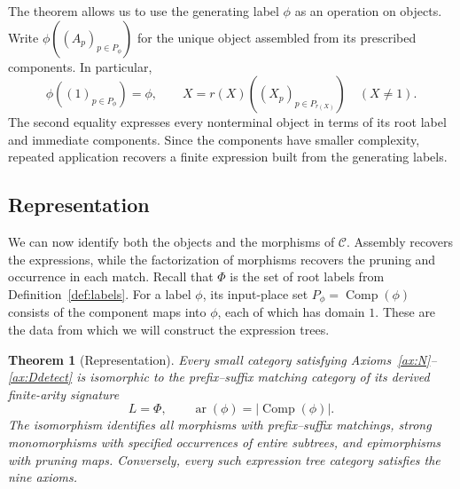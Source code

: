 \documentclass[11pt,a4paper]{article}
\theoremstyle{plain}
\newtheorem{theorem}{Theorem}[section]
\theoremstyle{definition}
\theoremstyle{remark}
\newcommand{\C}{\mathcal C}
\newcommand{\one}{1}
\newcommand{\Comp}{\operatorname{Comp}}
\begin{document}
\label{not:assembly-operation}
The theorem allows us to use the generating label $\phi$ as an
operation on objects. Write $\phi((A_p)_{p\in P_\phi})$ for the
unique object assembled from its prescribed components.
In particular,
\[
 \phi((\one)_{p\in P_\phi})=\phi,\qquad
X=r(X)((X_p)_{p\in P_{r(X)}})\quad(X\ne\one).
\]
The second equality expresses every nonterminal object in terms of
its root label and immediate components. Since the components have
smaller complexity, repeated application recovers a finite expression
built from the generating labels.

\subsection{Representation}\label{sec:representation}
We can now identify both the objects and the morphisms of $\C$.
Assembly recovers the expressions, while the factorization of
morphisms recovers the pruning and occurrence in each match.
Recall that $\Phi$ is the set of root labels from
Definition~\ref{def:labels}. For a label $\phi$, its input-place
set $P_\phi=\Comp(\phi)$ consists of the component maps into
$\phi$, each of which has domain $\one$. These are the data
from which we will construct the expression trees.
\begin{theorem}[Representation]\label{thm:representation}
Every small category satisfying Axioms~\ref{ax:N}--\ref{ax:Ddetect}
is isomorphic to the prefix--suffix matching category of its derived
finite-arity signature
\[
L=\Phi,\qquad \operatorname{ar}(\phi)=|\Comp(\phi)|.
\]
The isomorphism identifies all morphisms with prefix--suffix matchings,
strong monomorphisms with specified occurrences of entire subtrees,
and epimorphisms with pruning maps. Conversely, every such expression
tree category satisfies the nine axioms.
\end{theorem}
\end{document}
